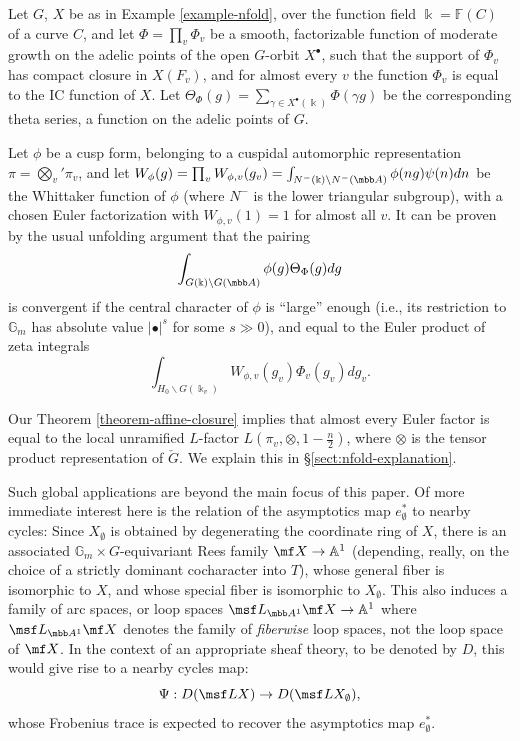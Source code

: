 \begin{eg}
\notready\label{example-nfold-global}
 Let $G$, $X$ be as in Example \ref{example-nfold}, over the function field $\Bbbk = \mathbb F(C)$ of a curve $C$, and let $\Phi = \prod_v \Phi_v$ be a smooth, factorizable function of moderate growth on the adelic points of the open $G$-orbit $X^\bullet$, such that the support of $\Phi_v$ has compact closure in $X(F_v)$, and for almost every $v$ the function $\Phi_v$ is equal to the IC function of $X$. Let $\Theta_\Phi(g) = \sum_{\gamma\in X^\bullet(\Bbbk)} \Phi(\gamma g)$ be the corresponding theta series, a function on the adelic points of $G$.

 Let $\phi$ be a cusp form, belonging to a cuspidal automorphic representation $\pi =  \bigotimes_v' \pi_v$, and let $W_\phi(g) = \prod_v W_{\phi, v}(g_v) = \int_{N^-(\Bbbk)\backslash N^-(\mbb A)} \phi(ng) \psi(n) dn$ be the Whittaker function of $\phi$ (where $N^-$ is the lower triangular subgroup), with a chosen Euler factorization with $W_{\phi,v}(1)=1$ for almost all $v$. It can be proven by the usual unfolding argument that the pairing
 \[ \int_{G(\Bbbk)\backslash G(\mbb A)} \phi(g) \Theta_\Phi(g) dg\]
 is convergent if the central character of $\phi$ is ``large'' enough (i.e., its restriction to $\mathbb G_m$ has absolute value $|\bullet|^s$ for some $s \gg 0$), and equal to the Euler product of zeta integrals
 \[ \int_{H_0\backslash G (\Bbbk_v)} W_{\phi,v}(g_v) \Phi_v(g_v) dg_v.\]

 Our Theorem \ref{theorem-affine-closure} implies that almost every Euler factor is equal to the local unramified $L$-factor $L(\pi_v, \otimes, 1 - \frac{n}{2})$, where $\otimes$ is the tensor product representation of $\check G$.  We explain this in \S \ref{sect:nfold-explanation}.
\end{eg}









Such global applications are beyond the main focus of this paper. Of more immediate interest here is the relation of the asymptotics map $e_\emptyset^*$ to nearby cycles: Since $X_\emptyset$ is obtained by degenerating the coordinate ring of $X$, there is an associated $\mathbb G_m\times G$-equivariant Rees family $\mf X\to \mathbb A^1$ (depending, really, on the choice of a strictly dominant cocharacter into $T$), whose general fiber is isomorphic to $X$, and whose special fiber is isomorphic to $X_\emptyset$. This also induces a family of arc spaces, or loop spaces $\msf L_{\mbb A^1}\mf X\to \mathbb A^1$ where $\msf L_{\mbb A^1}\mf X$ denotes the family of \emph{fiberwise} loop spaces, not the loop space of $\mf X$. In the context of an appropriate sheaf theory, to be denoted by $D$, this would give rise to a nearby cycles map:
\[ \Psi: D(\msf LX) \to D(\msf LX_\emptyset),\]
whose Frobenius trace is expected to recover the asymptotics map $e_\emptyset^*$.

